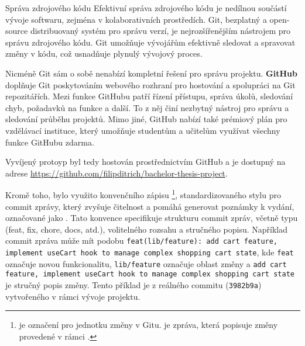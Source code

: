 \begin{subsection}{Správa zdrojového kódu}
    \label{subsec:implementace-sprava-zdrojoveho-kodu}
    Efektivní správa zdrojového kódu je nedílnou součástí vývoje softwaru, zejména v kolaborativních prostředích.
    Git, bezplatný a open-source distribuovaný systém pro správu verzí, je nejrozšířenějším nástrojem pro správu zdrojového kódu.
    Git umožňuje vývojářům efektivně sledovat a spravovat změny v kódu, což usnadňuje plynulý vývojový proces\cite{g__git_scm_com}.

    Nicméně Git sám o sobě nenabízí kompletní řešení pro správu projektu.
    \textbf{GitHub} doplňuje Git poskytováním webového rozhraní pro hostování a spolupráci na Git repozitářích.
    Mezi funkce GitHubu patří řízení přístupu, správa úkolů, sledování chyb, požadavků na funkce a další\cite{g_github_com_about}.
    To z něj činí nezbytný nástroj pro správu a sledování průběhu projektů.
    Mimo jiné, GitHub nabízí také prémiový plán pro vzdělávací instituce, který umožňuje studentům a učitelům využívat všechny funkce GitHubu zdarma\cite{e_education_github_com_pack}.

    Vyvíjený protoyp byl tedy hostován prostřednictvím GitHub a je dostupný na adrese \url{https://github.com/filipditrich/bachelor-thesis-project}.

    Kromě toho, bylo využito konvenčního zápisu \footnote{ je označení pro jednotku změny v Gitu.  je zpráva, která popisuje změny provedené v rámci .}, standardizovaného stylu pro commit zprávy, který zvyšuje čitelnost a pomáhá generovat poznámky k vydání, označované jako .
    Tato konvence specifikuje strukturu commit zpráv, včetně typu (feat, fix, chore, docs, atd.), volitelného rozsahu a stručného popisu.
    Například commit zpráva může mít podobu \texttt{feat(lib/feature): add cart feature, implement useCart hook to manage complex shopping cart state}, kde \texttt{feat} označuje novou funkcionalitu, \texttt{lib/feature} označuje oblast změny a \texttt{add cart feature, implement useCart hook to manage complex shopping cart state} je stručný popis změny.
    Tento příklad je z reálného commitu (\texttt{3982b9a}) vytvořeného v rámci vývoje projektu.
\end{subsection}
